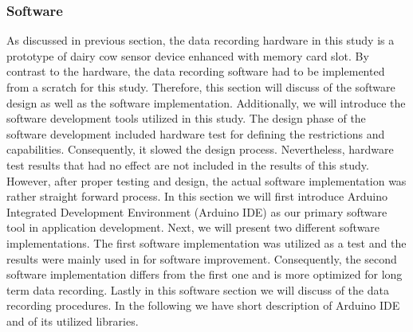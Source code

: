\documentclass[english,12pt,a4paper,pdftex,elec,utf8]{aaltothesis}
\begin{document}


\subsubsection{Software} \label{softwaresection}

As discussed in previous section, the data recording hardware in this study is a prototype of dairy cow sensor device enhanced with memory card slot. By contrast to the hardware, the data recording software had to be implemented from a scratch for this study. Therefore, this section will discuss of the software design as well as the software implementation.  Additionally, we will introduce the software development tools utilized in this study. The design phase of the software development included hardware test for defining the restrictions and capabilities. Consequently, it slowed the design process. Nevertheless, hardware test results that had no effect are not included in the results of this study. However, after proper testing and design, the actual software implementation was rather straight forward process. In this section we will first introduce Arduino Integrated Development Environment (Arduino IDE) \cite{arduinoide} as our primary software tool in application development. Next, we will present two different software implementations. The first software implementation was utilized as a test and the results were mainly used in for software improvement. Consequently, the second software implementation differs from the first one and is more optimized for long term data recording. Lastly in this software section we will discuss of the data recording procedures. In the following we have short description of Arduino IDE and of its utilized libraries.
\end{document}
